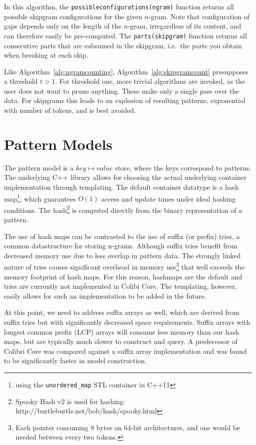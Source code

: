 \documentclass[review]{elsarticle}
\begin{document}
In this algorithm, the \texttt{possibleconfigurations(ngram)} function returns
all possible skipgram configurations for the given $n$-gram. Note that
configuration of gaps depends only on the length of the $n$-gram, irregardless
of its content, and can therefore easily be pre-computed. The
\texttt{parts(skipgram)} function returns all consecutive parts that are
subsumed in the skipgram, i.e.\ the parts you obtain when breaking at each
skip.

Like Algorithm~\ref{alg:ngramcounting}, Algorithm~\ref{alg:skipgramcount}
presupposes a threshold $t>1$. For threshold one, more trivial algorithms are
invoked, as the user does not want to prune anything. These make only a single
pass over the data. For skipgrams this leads to an explosion of
resulting patterns, exponential with number of tokens, and is best avoided.

\section{Pattern Models}

The pattern model is a $key \mapsto value$ store, where the keys correspond to
patterns. The underlying C++ library allows for choosing the actual underlying
container implementation through templating. The default container datatype is
a hash map\footnote{using the \texttt{unordered\_map} STL container in C++11},
which guarantees $O(1)$ access and update times under ideal hashing conditions. The
hash\footnote{Spooky Hash v2 is used for hashing:
http://burtleburtle.net/bob/hash/spooky.html} is computed directly from the
binary representation of a pattern.

The use of hash maps can be contrasted to the use of suffix (or prefix) tries,
a common datastructure for storing n-grams. Although suffix tries benefit from
decreased memory use due to less overlap in pattern data. The strongly linked
nature of tries causes significant overhead in memory use\footnote{Each pointer
consuming 8 bytes on 64-bit architectures, and one would be needed between
every two tokens.} that well exceeds the memory footprint of hash maps. For
this reason, hashmaps are the default and tries are currently not implemented
in Colibi Core. The templating, however, easily allows for such an
implementation to be added in the future.

At this point, we need to address suffix arrays \citep{Manber90} as well, which
are derived from suffix tries but with significantly decreased space
requirements. Suffix arrays with longest common prefix (LCP) arrays will
consume less memory than our hash maps, but are typically much slower to construct
and query. A predecessor of Colibri Core was compared against a suffix array
implementation \citep{Stehouwer10} and was found to be significantly faster in
model construction.
\end{document}
